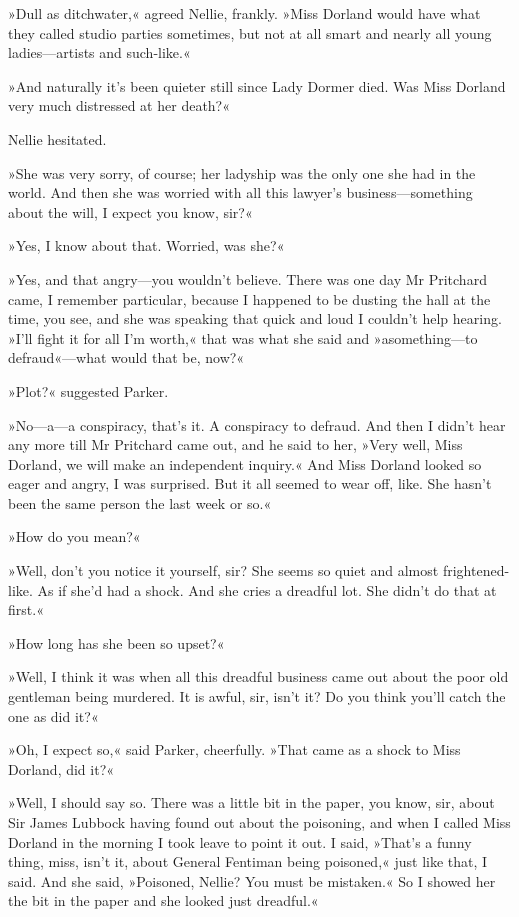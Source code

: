 »Dull as ditchwater,« agreed Nellie, frankly. »Miss Dorland would have what they called studio parties sometimes, but not at all smart and nearly all young ladies—artists and such-like.«

»And naturally it's been quieter still since Lady Dormer died. Was Miss Dorland very much distressed at her death?«

Nellie hesitated.

»She was very sorry, of course; her ladyship was the only one she had in the world. And then she was worried with all this lawyer's business—something about the will, I expect you know, sir?«

»Yes, I know about that. Worried, was she?«

»Yes, and that angry—you wouldn't believe. There was one day Mr Pritchard came, I remember particular, because I happened to be dusting the hall at the time, you see, and she was speaking that quick and loud I couldn't help hearing. »I'll fight it for all I'm worth,« that was what she said and »a\textellipsis  something—to defraud«—what would that be, now?«

»Plot?« suggested Parker.

»No—a—a conspiracy, that's it. A conspiracy to defraud. And then I didn't hear any more till Mr Pritchard came out, and he said to her, »Very well, Miss Dorland, we will make an independent inquiry.« And Miss Dorland looked so eager and angry, I was surprised. But it all seemed to wear off, like. She hasn't been the same person the last week or so.«

»How do you mean?«

»Well, don't you notice it yourself, sir? She seems so quiet and almost frightened-like. As if she'd had a shock. And she cries a dreadful lot. She didn't do that at first.«

»How long has she been so upset?«

»Well, I think it was when all this dreadful business came out about the poor old gentleman being murdered. It is awful, sir, isn't it? Do you think you'll catch the one as did it?«

»Oh, I expect so,« said Parker, cheerfully. »That came as a shock to Miss Dorland, did it?«

»Well, I should say so. There was a little bit in the paper, you know, sir, about Sir James Lubbock having found out about the poisoning, and when I called Miss Dorland in the morning I took leave to point it out. I said, »That's a funny thing, miss, isn't it, about General Fentiman being poisoned,« just like that, I said. And she said, »Poisoned, Nellie? You must be mistaken.« So I showed her the bit in the paper and she looked just dreadful.«

